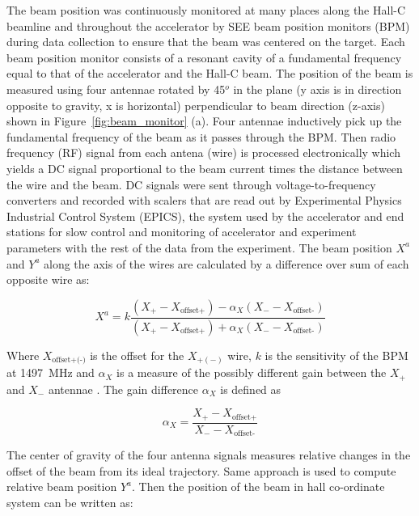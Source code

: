 The beam position was continuously monitored at many places along the Hall-C beamline and throughout the accelerator by SEE beam position monitors (BPM) during data collection to ensure that the beam was centered on the target. Each beam position monitor consists of a resonant cavity of a fundamental frequency equal to that of the accelerator and the Hall-C beam. The position of the beam is measured using four antennae rotated by 45$^o$ in the plane (y axis is in direction opposite to gravity, x is horizontal) perpendicular to beam direction (z-axis) shown in Figure~\ref{fig:beam_monitor} (a).
Four antennae inductively pick up the fundamental frequency of the beam as it passes through the BPM. Then radio frequency (RF) signal from each antena (wire) is processed electronically which yields a DC signal proportional to the beam current times the distance between the wire and the beam. DC signals were sent through voltage-to-frequency converters and recorded with scalers that are read out by Experimental Physics Industrial Control System (EPICS), the system used by the accelerator and end stations for slow control and monitoring of accelerator and experiment parameters with the rest of the data from the experiment. The beam position $X^a$ and $Y^a$ along the axis of the wires are calculated by a difference over sum of each opposite wire as:

\begin{equation} \label{equ:bpm1}
X^{a} = k \frac{\left(X_{+} - X_{\textrm{offset+}}\right) - \alpha_{X}\left(X_{-} - X_{\textrm{offset-}}\right)}{\left(X_{+} - X_{\textrm{offset+}}\right) + \alpha_{X}\left(X_{-} - X_{\textrm{offset-}}\right)}
\end{equation}

Where $X_{\textrm{offset+(-)}}$ is the offset for the $X_{+(-)}$ wire, $k$ is the sensitivity of the BPM at 1497~MHz and $\alpha_{X}$ is a measure of the possibly different gain between the $X_{+}$ and $X_{-}$ antennae \cite{sarah_G0,bpm1}. The gain difference $\alpha_X$ is defined as

\begin{equation} \label{equ:bpm2}
\alpha_{X} = \frac{X_{+} - X_{\textrm{offset+}}}{X_- - X_{\textrm{offset-}}}
\end{equation}

The center of gravity of the four antenna signals measures relative changes in the offset of the beam from its ideal trajectory. Same approach is used to compute relative beam position $Y^a$. Then the position of the beam in hall co-ordinate system can be written as:

